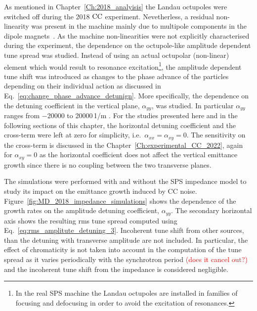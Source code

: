 As mentioned in Chapter~\ref{Ch:2018_analyisis} the Landau octupoles were switched off during the 2018 ${\mathrm{CC}}$ experiment. Nevetherless, a residual non-linearity was present in the machine mainly due to multipole components in the dipole magnets~\cite{Carlà:2664976, Alekou:2640326}. As the machine non-linearities were not explicitly characterised during the experiment, the dependence on the octupole-like amplitude dependent tune spread was studied. Instead of using an actual octupolar (non-linear) element which would result to resonance excitation\footnote{In the real SPS machine the Landau octupoles are installed in families of focusing and defocusing in order to avoid the excitation of resonances.}, the amplitude dependent tune shift was introduced as changes to the phase advance of the particles depending on their individual action as discussed in Eq.~\eqref{eq:change_phase_advance_detunign}. More specifically, the dependence on the detuning coefficient in the vertical plane, $\alpha_{yy}$, was studied. In particular $\alpha_{yy}$ ranges from $-$20000 to 20000\,1/m . For the studies presented here and in the following sections of this chapter, the horizontal detuning coefficient and the cross-term were left at zero for simplicity, i.e.~$\alpha_{xx} = \alpha_{xy} = 0$. %
The sensitivity on the cross-term is discussed in the Chapter~\ref{Ch:experimental_CC_2022}, again for $\alpha_{xy} = 0$ as the horizontal coefficient does not affect the vertical emittance growth since there is no coupling between the two transverse planes.

The simulations were performed with and without the SPS impedance model to study its impact on the emittance growth induced by CC noise. Figure~\ref{fig:MD_2018_impedance_simulations} shows the dependence of the growth rates on the amplitude detuning coefficient, $\alpha_{yy}$. The secondary horizontal axis shows the resulting rms tune spread computed using Eq.~\eqref{eq:rms_amplitute_detuning_3}. Incoherent tune shift from other sources, than the detuning with transverse amplitude are not included. In particular, the effect of chromaticity is not taken into account in the computation of the tune spread as it varies periodically with the synchrotron period \textcolor{red}{(does it cancel out?)} and the incoherent tune shift from the impedance is considered negligible. 

